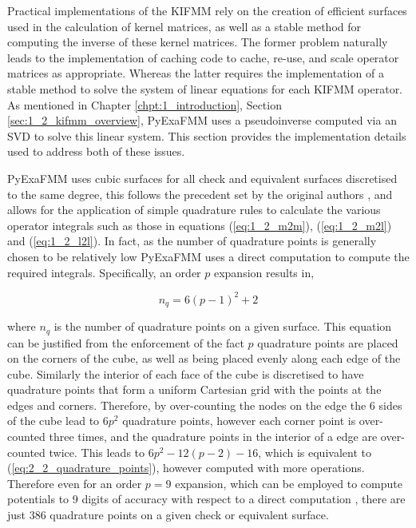 Practical implementations of the \gls{KIFMM} rely on the creation of efficient
surfaces used in the calculation of kernel matrices, as well as a stable method for
computing the inverse of these kernel matrices. The former problem naturally leads
to the implementation of caching code to cache, re-use, and scale operator matrices
as appropriate. Whereas the latter requires the implementation of a stable method to
solve the system of linear equations for each \gls{KIFMM} operator. As mentioned
in Chapter \ref{chpt:1_introduction}, Section \ref{sec:1_2_kifmm_overview}, \gls{PyExaFMM} uses
a pseudoinverse computed via an SVD to solve this linear system. This section
provides the implementation details used to address both of these issues.

\gls{PyExaFMM} uses cubic surfaces for all check and equivalent surfaces discretised
to the same degree, this follows the precedent set by the original authors \cite{Ying:2004:JCP}, and
allows for the application of simple quadrature rules to calculate the various
operator integrals such as those in equations (\ref{eq:1_2_m2m}), (\ref{eq:1_2_m2l})
and (\ref{eq:1_2_l2l}). In fact, as the number of quadrature points is generally
chosen to be relatively low \gls{PyExaFMM} uses a direct computation to
compute the required integrals. Specifically, an order $p$ expansion results in,

\begin{equation}
    n_q =  6(p-1)^2 + 2
    \label{eq:2_2_quadrature_points}
\end{equation}

where $n_q$ is the number of quadrature points on a given surface. This equation can be
justified from the enforcement of the fact $p$ quadrature points are placed on the corners
of the cube, as well as being placed evenly along each edge of the cube. Similarly the
interior of each face of the cube is discretised to have quadrature points that form
a uniform Cartesian grid with the points at the edges and corners. Therefore,
by over-counting the nodes on the edge the 6 sides of the cube lead to $6p^2$ quadrature
points, however each corner point is over-counted three times, and the quadrature points
in the interior of a edge are over-counted twice. This leads to $6p^2 - 12(p-2) - 16$,
which is equivalent to (\ref{eq:2_2_quadrature_points}), however computed with more operations.
Therefore even for an order $p=9$ expansion, which can be employed to compute
potentials to 9 digits of accuracy with respect to a direct computation
\cite{Malhotra:2015:CCP}, there are just 386 quadrature points on a given check
or equivalent surface.

